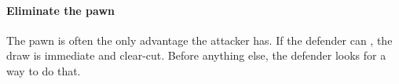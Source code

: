 \paragraph{Eliminate the pawn}

The pawn is often the only advantage the attacker has. If the defender can
, the draw is immediate and clear-cut. Before anything else, the
defender looks for a way to do that.
